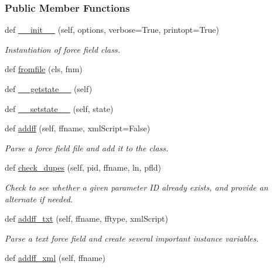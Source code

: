 \subsubsection*{Public Member Functions}
\begin{DoxyCompactItemize}
\item 
def \hyperlink{classsrc_1_1forcefield_1_1FF_a612049f6ab09b343948bd372914b47d2}{\+\_\+\+\_\+init\+\_\+\+\_\+} (self, options, verbose=True, printopt=True)
\begin{DoxyCompactList}\small\item\em Instantiation of force field class. \end{DoxyCompactList}\item 
def \hyperlink{classsrc_1_1forcefield_1_1FF_a92b3b4ead5fda0434addbda3794201ce}{fromfile} (cls, fnm)
\item 
def \hyperlink{classsrc_1_1forcefield_1_1FF_a0e4259637b2d201720482c7ccb863e10}{\+\_\+\+\_\+getstate\+\_\+\+\_\+} (self)
\item 
def \hyperlink{classsrc_1_1forcefield_1_1FF_ae838bfa3d96d22d82551a6ecf9daf34e}{\+\_\+\+\_\+setstate\+\_\+\+\_\+} (self, state)
\item 
def \hyperlink{classsrc_1_1forcefield_1_1FF_ae1092a94c188af5bb65da2bb3ac89c5f}{addff} (self, ffname, xml\+Script=False)
\begin{DoxyCompactList}\small\item\em Parse a force field file and add it to the class. \end{DoxyCompactList}\item 
def \hyperlink{classsrc_1_1forcefield_1_1FF_ac8f4023883fb660b344e7954a68e936e}{check\+\_\+dupes} (self, pid, ffname, ln, pfld)
\begin{DoxyCompactList}\small\item\em Check to see whether a given parameter ID already exists, and provide an alternate if needed. \end{DoxyCompactList}\item 
def \hyperlink{classsrc_1_1forcefield_1_1FF_a3baed9ce29ad2b22ec380ffed7fbd237}{addff\+\_\+txt} (self, ffname, fftype, xml\+Script)
\begin{DoxyCompactList}\small\item\em Parse a text force field and create several important instance variables. \end{DoxyCompactList}\item 
def \hyperlink{classsrc_1_1forcefield_1_1FF_a6e68a9d214deb509c95b830e81aa18ce}{addff\+\_\+xml} (self, ffname)

\end{DoxyCompactItemize}
